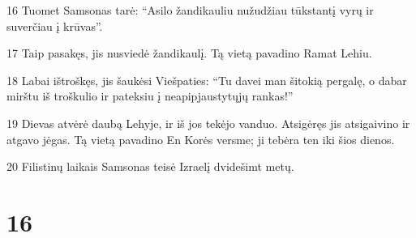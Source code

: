 \par 16 Tuomet Samsonas tarė: “Asilo žandikauliu nužudžiau tūkstantį vyrų ir suverčiau į krūvas”. 
\par 17 Taip pasakęs, jis nusviedė žandikaulį. Tą vietą pavadino Ramat Lehiu. 
\par 18 Labai ištroškęs, jis šaukėsi Viešpaties: “Tu davei man šitokią pergalę, o dabar mirštu iš troškulio ir pateksiu į neapipjaustytųjų rankas!” 
\par 19 Dievas atvėrė daubą Lehyje, ir iš jos tekėjo vanduo. Atsigėręs jis atsigaivino ir atgavo jėgas. Tą vietą pavadino En Korės versme; ji tebėra ten iki šios dienos. 
\par 20 Filistinų laikais Samsonas teisė Izraelį dvidešimt metų.



\chapter{16}


